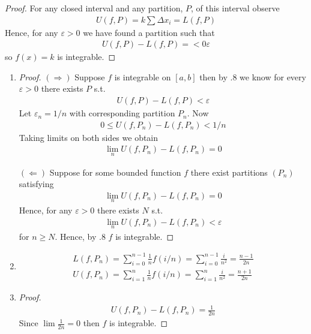\begin{proof}
    For any closed interval and any partition, $P$, of 
    this interval observe
    \begin{align*}
        U(f,P) = k \sum \Delta x_i = L(f,P)
    \end{align*}
    Hence, for any $\varepsilon>0$ we have found a partition 
    such that 
    \begin{align*}
        U(f,P) - L(f,P) = < 0 \varepsilon
    \end{align*}
    so $f(x)=k$ is integrable.
\end{proof}

\begin{enumerate}[label=(\alph*)]
    \item 
    \begin{proof}
        $(\Rightarrow)$ Suppose $f$ is integrable on $[a,b]$ then by .8 
        we know for every $\varepsilon>0$ there exists $P$ s.t. 
        \begin{align*}
            U(f,P) - L(f,P) < \varepsilon
        \end{align*}
        Let $\varepsilon_n = 1/n$ with corresponding partition $P_n$.
        Now 
        \begin{align*}
            0 \leq U(f,P_n) - L(f,P_n) < 1/n
        \end{align*}
        Taking limits on both sides we obtain 
        \begin{align*}
            \lim_n U(f,P_n) - L(f,P_n) = 0
        \end{align*}

        $(\Leftarrow)$ Suppose for some bounded function 
        $f$ there exist partitions $(P_n)$ satisfying
        \begin{align*}
            \lim_n U(f,P_n) - L(f,P_n) = 0
        \end{align*}
        Hence, for any $\varepsilon>0$ there exists $N$ s.t. 
        \begin{align*}
            \lim_n U(f,P_n) - L(f,P_n) < \varepsilon
        \end{align*}
        for $n\geq N$. Hence, by .8 $f$ is integrable.
    \end{proof}

    \item
    \begin{gather*}
        L(f, P_n) = \sum_{i=0}^{n-1} \frac{1}{n} f(i/n) = \sum_{i=0}^{n-1} \frac{i}{n^2} = \frac{n-1}{2n} \\
        U(f, P_n) = \sum_{i=1}^{n} \frac{1}{n} f(i/n) = \sum_{i=1}^{n} \frac{i}{n^2} = \frac{n+1}{2n}
    \end{gather*}

    \item
    \begin{proof}
        \begin{align*}
            U(f, P_n) - L(f, P_n) = \frac{1}{2n}
        \end{align*}
        Since $\lim \frac{1}{2n} = 0$ then $f$ is integrable.
    \end{proof}
\end{enumerate}

